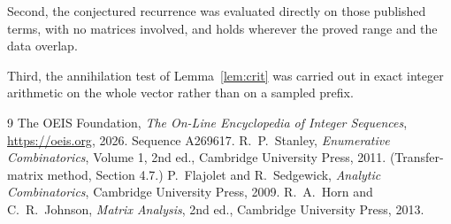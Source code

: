 \documentclass[11pt,a4paper]{article}
\theoremstyle{plain}
\theoremstyle{definition}
\begin{document}
Second, the conjectured recurrence was evaluated directly on those published terms, with no
matrices involved, and holds wherever the proved range and the data overlap.

Third, the annihilation test of Lemma~\ref{lem:crit} was carried out in exact integer
arithmetic on the whole vector rather than on a sampled prefix.

\begin{thebibliography}{9}
 The OEIS Foundation, \emph{The On-Line Encyclopedia of Integer
Sequences}, \url{https://oeis.org}, 2026. Sequence A269617.
 R.~P.~Stanley, \emph{Enumerative Combinatorics}, Volume 1, 2nd ed.,
Cambridge University Press, 2011. (Transfer-matrix method, Section 4.7.)
 P.~Flajolet and R.~Sedgewick, \emph{Analytic Combinatorics}, Cambridge
University Press, 2009.
 R.~A.~Horn and C.~R.~Johnson, \emph{Matrix Analysis}, 2nd ed., Cambridge
University Press, 2013.
\end{thebibliography}
\end{document}
